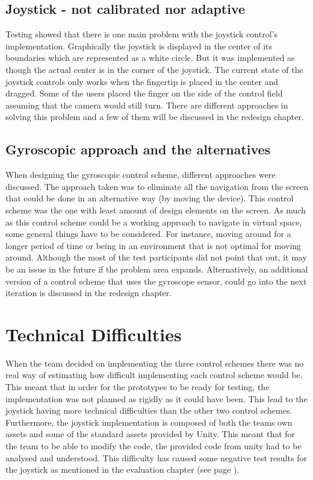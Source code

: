 \subsection*{Joystick - not calibrated nor adaptive}\label{DiscussionJoystick}
Testing showed that there is one main problem with the joystick control's implementation. Graphically the joystick is displayed in the center of its boundaries which are represented as a white circle. But it was implemented as though the actual center is in the corner of the joystick. The current state of the joystick controls only works when the fingertip is placed in the center and dragged. Some of the users placed the finger on the side of the control field assuming that the camera would still turn. There are different approaches in solving this problem and a few of them will be discussed in the redesign chapter. 

\subsection*{Gyroscopic approach and the alternatives}
When designing the gyroscopic control scheme, different approaches were discussed. The approach taken was to eliminate all the navigation from the screen that could be done in an alternative way (by moving the device). This control scheme was the one with least amount of design elements on the screen.
As much as this control scheme could be a working approach to navigate in virtual space, some general things have to be considered. For instance, moving around for a longer period of time or being in an environment that is not optimal for moving around. Although the most of the test participants did not point that out, it may be an issue in the future if the problem area expands.
Alternatively, an additional version of a control scheme that uses the gyroscope sensor, could go into the next iteration is discussed in the redesign chapter.

\section*{Technical Difficulties}
When the team decided on implementing the three control schemes there was no real way of estimating how difficult implementing each control scheme would be. This meant that in order for the prototypes to be ready for testing, the implementation was not planned as rigidly as it could have been. This lead to the joystick having more technical difficulties than the other two control schemes. Furthermore, the joystick implementation is composed of both the teams own assets and some of the standard assets provided by Unity. This meant that for the team to be able to modify the code, the provided code from unity had to be analysed and understood. This difficulty has caused some negative test results for the joystick as mentioned in the evaluation chapter (see page \pageref{joystickEvaluationResults}). 

